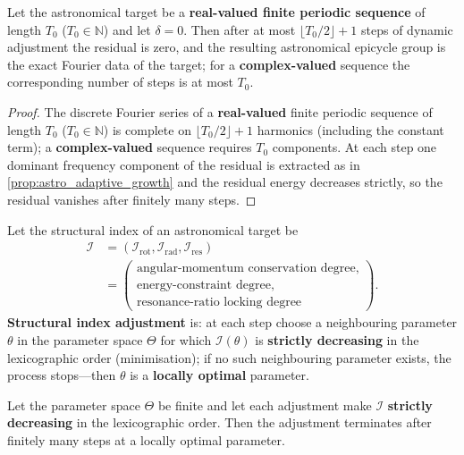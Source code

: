 \begin{theorem}\label{thm:astro_adaptive_convergence}
Let the astronomical target be a \textbf{real-valued finite periodic sequence} of length $T_0$ ($T_0\in\mathbb N$) and let $\delta=0$. Then after at most $\lfloor T_0/2\rfloor+1$ steps of dynamic adjustment the residual is zero, and the resulting astronomical epicycle group is the exact Fourier data of the target; for a \textbf{complex-valued} sequence the corresponding number of steps is at most $T_0$.
\end{theorem}

\begin{proof}
The discrete Fourier series of a \textbf{real-valued} finite periodic sequence of length $T_0$ ($T_0\in\mathbb N$) is complete on $\lfloor T_0/2\rfloor+1$ harmonics (including the constant term); a \textbf{complex-valued} sequence requires $T_0$ components. At each step one dominant frequency component of the residual is extracted as in \cref{prop:astro_adaptive_growth} and the residual energy decreases strictly, so the residual vanishes after finitely many steps.
\end{proof}

\begin{definition}\label{def:astro_structure_metric_adjustment}
Let the structural index of an astronomical target be
\[
\begin{aligned}
\mathcal I
&=(\mathcal I_{\mathrm{rot}},\mathcal I_{\mathrm{rad}},\mathcal I_{\mathrm{res}})\\
&=\left(\begin{array}{l}
\text{angular-momentum conservation degree},\\
\text{energy-constraint degree},\\
\text{resonance-ratio locking degree}
\end{array}\right).
\end{aligned}
\]
\textbf{Structural index adjustment} is: at each step choose a neighbouring parameter $\theta$ in the parameter space $\Theta$ for which $\mathcal I(\theta)$ is \textbf{strictly decreasing} in the lexicographic order (minimisation); if no such neighbouring parameter exists, the process stops---then $\theta$ is a \textbf{locally optimal} parameter.
\end{definition}

\begin{proposition}\label{prop:astro_structure_metric_convergence}
Let the parameter space $\Theta$ be finite and let each adjustment make $\mathcal I$ \textbf{strictly decreasing} in the lexicographic order. Then the adjustment terminates after finitely many steps at a locally optimal parameter.
\end{proposition}

